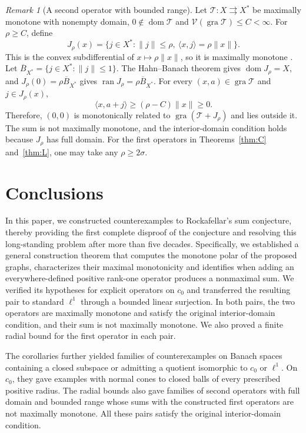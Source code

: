 \documentclass[11pt]{article}
\newcommand{\gra}{\operatorname{gra}}
\newcommand{\dom}{\operatorname{dom}}
\newcommand{\pair}[2]{\langle #1,#2\rangle}
\theoremstyle{definition}
\theoremstyle{remark}
\newtheorem{remark}{Remark}
\begin{document}
\begin{remark}[A second operator with bounded range]
\label{rem:bounded-range-partner}
Let $\mathcal T:X\rightrightarrows X^*$ be maximally monotone with nonempty domain, $0\notin\dom\mathcal T$ and $\mathcal V(\gra\mathcal T)\le C<\infty$. For $\rho\ge C$, define
\[
J_\rho(x)=
\{j\in X^*:\|j\|\le\rho,\ \pair{x}{j}=\rho\|x\|\}.
\]
This is the convex subdifferential of $x\mapsto\rho\|x\|$, so it is maximally monotone \cite{rockafellar1970subdiff}. Let $\overline B_{X^*}=\{j\in X^*:\|j\|\le1\}$. The Hahn--Banach theorem gives $\dom J_\rho=X$, and $J_\rho(0)=\rho\overline B_{X^*}$ gives $\operatorname{ran}J_\rho=\rho\overline B_{X^*}$. For every $(x,a)\in\gra\mathcal T$ and $j\in J_\rho(x)$,
\[
\pair{x}{a+j}\ge(\rho-C)\|x\|\ge0.
\]
Therefore, $(0,0)$ is monotonically related to $\gra(\mathcal T+J_\rho)$ and lies outside it. The sum is not maximally monotone, and the interior-domain condition holds because $J_\rho$ has full domain. For the first operators in Theorems~\ref{thm:C} and~\ref{thm:L}, one may take any $\rho\ge2\sigma$.
\end{remark}



\section{Conclusions}
\label{sec:conclusion}

In this paper, we constructed counterexamples to Rockafellar's sum conjecture, thereby providing the first complete disproof of the conjecture and resolving this long-standing problem after more than five decades. Specifically, we established a general construction theorem that computes the monotone polar of the proposed graphs, characterizes their maximal monotonicity and identifies when adding an everywhere-defined positive rank-one operator produces a nonmaximal sum. We verified its hypotheses for explicit operators on $c_0$ and transferred the resulting pair to standard $\ell^1$ through a bounded linear surjection. In both pairs, the two operators are maximally monotone and satisfy the original interior-domain condition, and their sum is not maximally monotone. We also proved a finite radial bound for the first operator in each pair.


The corollaries further yielded families of counterexamples on Banach spaces containing a closed subspace or admitting a quotient isomorphic to $c_0$ or $\ell^1$. On $c_0$, they gave examples with normal cones to closed balls of every prescribed positive radius. The radial bounds also gave families of second operators with full domain and bounded range whose sums with the constructed first operators are not maximally monotone. All these pairs satisfy the original interior-domain condition.
\end{document}
